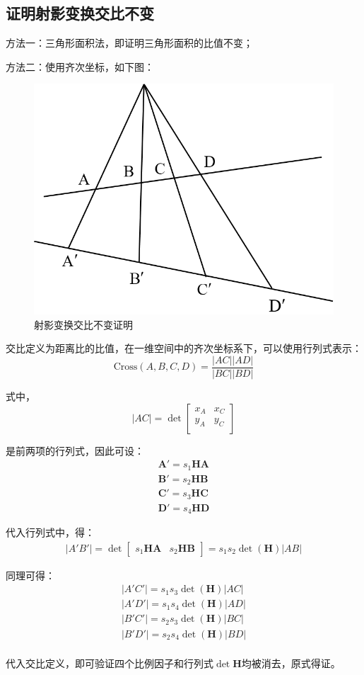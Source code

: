 \documentclass[11pt]{article}
\begin{document}
\subsection{证明射影变换交比不变}
方法一：三角形面积法，即证明三角形面积的比值不变；\par
方法二：使用齐次坐标，如下图：
\begin{figure}[H]
  \centering
  \includegraphics[width=0.5\linewidth]{证明题1.png}
  \caption{射影变换交比不变证明}
\end{figure}\par
交比定义为距离比的比值，在一维空间中的齐次坐标系下，可以使用行列式表示：
$$
\mathrm{Cross}(A,B,C,D)=\frac{
  |AC||AD|
}{|BC||BD|}
$$\par
式中，
$$
|AC|=\det\begin{bmatrix}
  x_A & x_C  \\
  y_A& y_C  \\
\end{bmatrix}
$$\par
是前两项的行列式，因此可设：
$$
\begin{aligned}
\mathbf{A}'=s_1\mathbf{HA}\\
\mathbf{B}'=s_2\mathbf{HB}\\
\mathbf{C}'=s_3\mathbf{HC}\\
\mathbf{D}'=s_4\mathbf{HD}
\end{aligned}
$$\par
代入行列式中，得：
$$
\begin{aligned}
|A'B'|=\det\begin{bmatrix}
  s_1\mathbf{HA}& s_2\mathbf{HB}  
\end{bmatrix}=s_1s_2\det(\mathbf{H})|AB|
\end{aligned}
$$\par
同理可得：
$$
\begin{aligned}
|A'C'|=s_1s_3\det(\mathbf{H})|AC|\\
|A'D'|=s_1s_4\det(\mathbf{H})|AD|\\
|B'C'|=s_2s_3\det(\mathbf{H})|BC|\\
|B'D'|=s_2s_4\det(\mathbf{H})|BD|\\
\end{aligned}
$$\par
代入交比定义，即可验证四个比例因子和行列式$\det\mathbf{H}$均被消去，原式得证。
\end{document}
